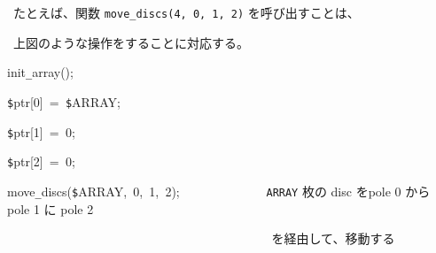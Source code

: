 \documentclass[a4paper,10pt]{article}
\def\mc{\relax}
\begin{document}
\noindent
\mbox{}\rm\mc {\tt\#}
\tt\mc 

\noindent
\mbox{}\rm\mc {\tt\#} \ たとえば、関数 {\tt move\_discs(4, 0, 1, 2)} を呼び出すことは、 
\tt\mc 

\noindent
\mbox{}\rm\mc {\tt\#} \ 上図のような操作をすることに対応する。\hfill 
\tt\mc 

\noindent
\mbox{}\hfill

\noindent
\mbox{}init{\tt\_}array();

\noindent
\mbox{}{\tt\$}ptr[0]{\tt\mc \ }={\tt\mc \ }{\tt\$}ARRAY;

\noindent
\mbox{}{\tt\$}ptr[1]{\tt\mc \ }={\tt\mc \ }0;

\noindent
\mbox{}{\tt\$}ptr[2]{\tt\mc \ }={\tt\mc \ }0;

\noindent
\mbox{}\hfill

\noindent
\mbox{}move{\tt\_}discs({\tt\$}ARRAY,{\tt\mc \ }0,{\tt\mc \ }1,{\tt\mc \ }2);{\tt\mc \ }{\tt\mc \ }{\tt\mc \ }{\tt\mc \ }{\tt\mc \ }{\tt\mc \ }{\tt\mc \ }{\tt\mc \ }{\tt\mc \ }{\tt\mc \ }{\tt\mc \ }{\tt\mc \ }\rm\mc {\tt\#} \ {\tt ARRAY} 枚の disc をpole 0 から pole 1 に pole 2\hfill 
\tt\mc 

\noindent
\mbox{}{\tt\mc \ }{\tt\mc \ }{\tt\mc \ }{\tt\mc \ }{\tt\mc \ }{\tt\mc \ }{\tt\mc \ }{\tt\mc \ }{\tt\mc \ }{\tt\mc \ }{\tt\mc \ }{\tt\mc \ }{\tt\mc \ }{\tt\mc \ }{\tt\mc \ }{\tt\mc \ }{\tt\mc \ }{\tt\mc \ }{\tt\mc \ }{\tt\mc \ }{\tt\mc \ }{\tt\mc \ }{\tt\mc \ }{\tt\mc \ }{\tt\mc \ }{\tt\mc \ }{\tt\mc \ }{\tt\mc \ }{\tt\mc \ }{\tt\mc \ }{\tt\mc \ }{\tt\mc \ }{\tt\mc \ }{\tt\mc \ }{\tt\mc \ }{\tt\mc \ }{\tt\mc \ }{\tt\mc \ }{\tt\mc \ }{\tt\mc \ }\rm\mc {\tt\#} \ を経由して、移動する \hfill 

\tt\mc 

\rm\mc
\end{document}
